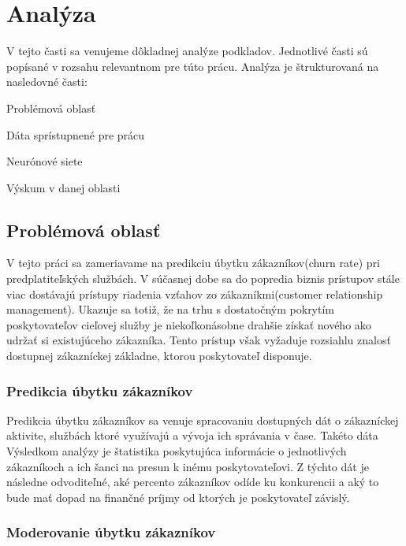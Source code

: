 \newpage
\chapter{Analýza}
\label{ch:Analýza}
V tejto časti sa venujeme dôkladnej analýze podkladov. Jednotlivé časti sú popísané v rozsahu relevantnom pre túto prácu. Analýza je štrukturovaná na nasledovné časti:

\begin{my_itemize}
	\item {Problémová oblasť}
	\item {Dáta sprístupnené pre prácu}
	\item {Neurónové siete}
	\item {Výskum v danej oblasti}
\end{my_itemize}

\section{Problémová oblasť}
\label{analyza_problemova_oblast}

V tejto práci sa zameriavame na predikciu úbytku zákazníkov(churn rate) pri predplatiteľských službách. V súčasnej dobe sa do popredia biznis prístupov stále viac dostávajú prístupy riadenia vzťahov zo zákazníkmi(customer relationship management). Ukazuje sa totiž, že na trhu s dostatočným pokrytím poskytovateľov cieľovej služby je niekoľkonásobne drahšie získať nového ako udržať si existujúceho zákazníka. Tento prístup však vyžaduje rozsiahlu znalosť dostupnej zákazníckej základne, ktorou poskytovateľ disponuje. \newline

\subsection{Predikcia úbytku zákazníkov}
\label{analyza_ubytok_zakaznikov}

Predikcia úbytku zákazníkov sa venuje spracovaniu dostupných dát o zákazníckej aktivite, službách ktoré využívajú a vývoja ich správania v čase. Takéto dáta  Výsledkom analýzy je štatistika poskytujúca informácie o jednotlivých zákazníkoch a ich šanci na presun k inému poskytovateľovi. Z týchto dát je následne odvoditeľné, aké percento zákazníkov odíde ku konkurencii a aký to bude mať dopad na finančné príjmy od ktorých je poskytovateľ závislý. 

\subsection{Moderovanie úbytku zákazníkov}
\label{analyza_moderovanie_ubytku}

